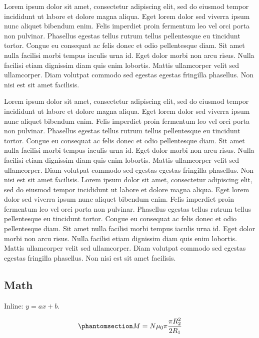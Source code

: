 \documentclass[
]{article}
\begin{document}
Lorem ipsum dolor sit amet, consectetur adipiscing elit, sed do eiusmod
tempor incididunt ut labore et dolore magna aliqua. Eget lorem dolor sed
viverra ipsum nunc aliquet bibendum enim. Felis imperdiet proin
fermentum leo vel orci porta non pulvinar. Phasellus egestas tellus
rutrum tellus pellentesque eu tincidunt tortor. Congue eu consequat ac
felis donec et odio pellentesque diam. Sit amet nulla facilisi morbi
tempus iaculis urna id. Eget dolor morbi non arcu risus. Nulla facilisi
etiam dignissim diam quis enim lobortis. Mattis ullamcorper velit sed
ullamcorper. Diam volutpat commodo sed egestas egestas fringilla
phasellus. Non nisi est sit amet facilisis.

Lorem ipsum dolor sit amet, consectetur adipiscing elit, sed do eiusmod
tempor incididunt ut labore et dolore magna aliqua. Eget lorem dolor sed
viverra ipsum nunc aliquet bibendum enim. Felis imperdiet proin
fermentum leo vel orci porta non pulvinar. Phasellus egestas tellus
rutrum tellus pellentesque eu tincidunt tortor. Congue eu consequat ac
felis donec et odio pellentesque diam. Sit amet nulla facilisi morbi
tempus iaculis urna id. Eget dolor morbi non arcu risus. Nulla facilisi
etiam dignissim diam quis enim lobortis. Mattis ullamcorper velit sed
ullamcorper. Diam volutpat commodo sed egestas egestas fringilla
phasellus. Non nisi est sit amet facilisis. Lorem ipsum dolor sit amet,
consectetur adipiscing elit, sed do eiusmod tempor incididunt ut labore
et dolore magna aliqua. Eget lorem dolor sed viverra ipsum nunc aliquet
bibendum enim. Felis imperdiet proin fermentum leo vel orci porta non
pulvinar. Phasellus egestas tellus rutrum tellus pellentesque eu
tincidunt tortor. Congue eu consequat ac felis donec et odio
pellentesque diam. Sit amet nulla facilisi morbi tempus iaculis urna id.
Eget dolor morbi non arcu risus. Nulla facilisi etiam dignissim diam
quis enim lobortis. Mattis ullamcorper velit sed ullamcorper. Diam
volutpat commodo sed egestas egestas fringilla phasellus. Non nisi est
sit amet facilisis.

\subsection{Math}\label{math}

Inline: \(y = ax+b\).

\begin{equation}\phantomsection\label{eq:example}{
M=N \mu_{0} \pi \frac{\pi R_{2}^{2}}{2 R_{1}}
}\end{equation}
\end{document}
